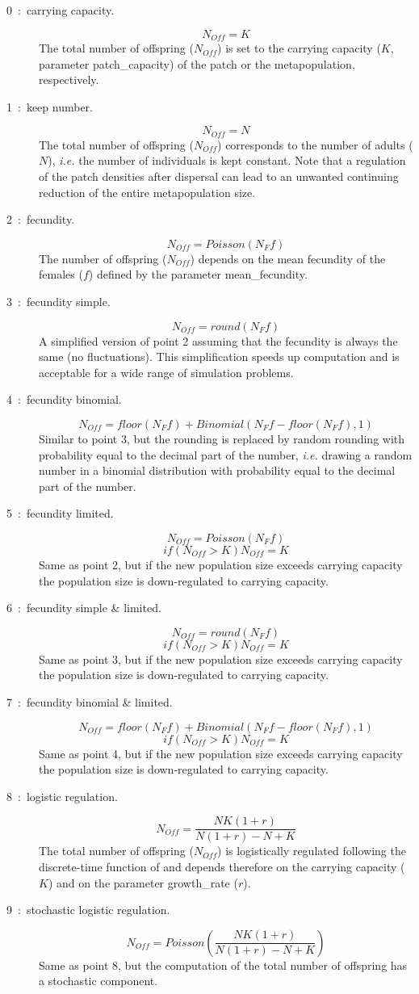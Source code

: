 \documentclass[letterpaper,12pt,oneside]{book}
\begin{document}
\begin{description}
\item [0~:~carrying capacity.]  \[ N_{Off} = K \]
The total number of offspring ($N_{Off}$) is set to the carrying capacity ($K$, parameter \textsf{patch\_capacity}) of the patch or the metapopulation, respectively.
\item [1~:~keep number.] \[ N_{Off} = N \]
The total number of offspring ($N_{Off}$) corresponds to the number of adults ($N$), \textit{i.e.} the number of individuals is kept constant. Note that a regulation of the patch densities after dispersal can lead to an unwanted continuing reduction of the entire metapopulation size. 
\item [2~:~fecundity.]  \[ N_{Off} = Poisson(N_{F}f) \]
The number of offspring ($N_{Off}$) depends on the mean fecundity of the females ($f$) defined by the parameter \textsf{mean\_fecundity}.
\item [3~:~fecundity simple.] \[ N_{Off} = round(N_{F}f) \]
A simplified version of point 2 assuming that the fecundity is always the same (no fluctuations). This simplification speeds up computation and is acceptable for a wide range of simulation problems.
\item [4~:~fecundity binomial.] \[ N_{Off} = floor(N_{F}f)+Binomial(N_{F}f-floor(N_{F}f),1) \]
Similar to point 3, but the rounding is replaced by random rounding with probability equal to the decimal part of the number, \textit{i.e.} drawing a random number in a binomial distribution with probability equal to the decimal part of the number.
\item [5~:~fecundity limited.] 
\[ N_{Off}= Poisson(N_{F}f) \]
\[ if(N_{Off}>K) N_{Off}=K \]
Same as point 2, but if the new population size exceeds carrying capacity the population size is down-regulated to carrying capacity.
\item [6~:~fecundity simple \& limited.]
\[ N_{Off}=round(N_{F}f) \]
\[ if(N_{Off}>K) N_{Off}=K \]
Same as point 3, but if the new population size exceeds carrying capacity the population size is down-regulated to carrying capacity.
\item [7~:~fecundity binomial \& limited.]
\[ N_{Off}=floor(N_{F}f)+Binomial(N_{F}f-floor(N_{F}f),1) \]
\[ if(N_{Off}>K) N_{Off}=K \]
Same as point 4, but if the new population size exceeds carrying capacity the population size is down-regulated to carrying capacity.
\item [8~:~logistic regulation.] \[ N_{Off} = \frac{NK(1+r)}{N(1+r)-N+K} \]
The total number of offspring ($N_{Off}$) is logistically regulated following the discrete-time function of \citet{Beverton_1957} and depends therefore on the carrying capacity ($K$) and on the parameter \textsf{growth\_rate} ($r$). 
\item [9~:~stochastic logistic regulation.] \[ N_{Off} = Poisson\left(\frac{NK(1+r)}{N(1+r)-N+K}\right) \] 
Same as point 8, but the computation of the total number of offspring has a stochastic component.
\end{description}
\end{document}
